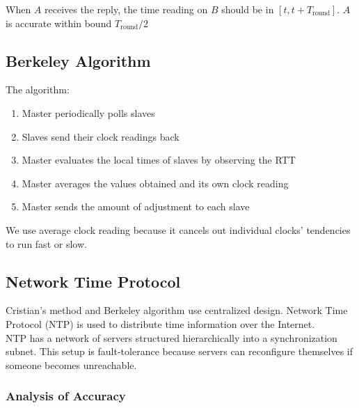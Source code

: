 \begin{multicols*}{2}
\noindent When $A$ receives the reply, the time reading on $B$ should be in $[t,t+ T_{\text{round}}]$. $A$ is accurate within bound $T_{\text{round}} / 2$

\subsection{Berkeley Algorithm}

\noindent The algorithm:
\begin{enumerate}
  \item Master periodically polls slaves
  \item Slaves send their clock readings back
  \item Master evaluates the local times of slaves by observing the RTT
  \item Master averages the values obtained and its own clock reading
  \item Master sends the amount of adjustment to each slave
\end{enumerate}

\noindent We use average clock reading because it cancels out individual clocks' tendencies to run fast or slow. 

\subsection{Network Time Protocol}

\noindent Cristian's method and Berkeley algorithm use centralized design. Network Time Protocol (NTP) is used to distribute time information over the Internet. \\

\noindent NTP has a network of servers structured hierarchically into a synchronization subnet. This setup is fault-tolerance because servers can reconfigure themselves if someone becomes unreachable. 

\subsubsection{Analysis of Accuracy}
\begin{center}
\end{center}
\end{multicols*}
